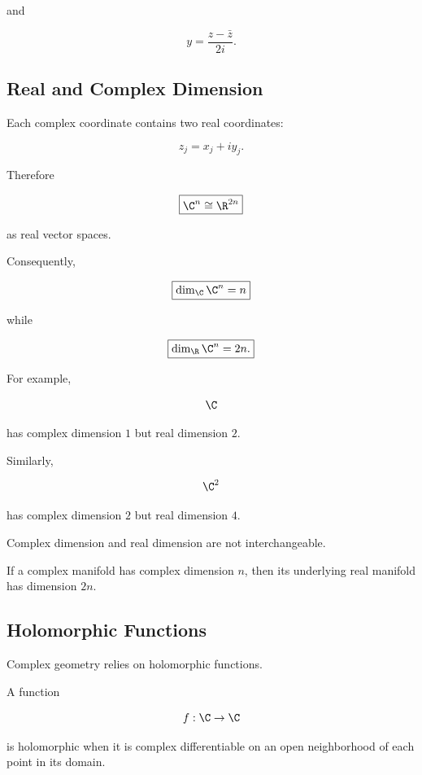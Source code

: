 and

\[
\boxed{y=\frac{z-\bar z}{2i}.}
\]

\subsection{Real and Complex Dimension}
\label{subsec:real-complex-dimension}

Each complex coordinate contains two real coordinates:

\[
z_j=x_j+iy_j.
\]

Therefore

\[
\boxed{\C^n\cong\R^{2n}}
\]

as real vector spaces.

Consequently,

\[
\boxed{
\dim_{\C}\C^n=n
}
\]

while

\[
\boxed{
\dim_{\R}\C^n=2n.
}
\]

For example,

\[
\C
\]

has complex dimension \(1\) but real dimension \(2\).

Similarly,

\[
\C^2
\]

has complex dimension \(2\) but real dimension \(4\).

\begin{warningbox}
Complex dimension and real dimension are not interchangeable.

If a complex manifold has complex dimension \(n\), then its underlying real
manifold has dimension \(2n\).
\end{warningbox}

\subsection{Holomorphic Functions}
\label{subsec:complex-geometry-holomorphic-functions}

Complex geometry relies on holomorphic functions.

A function

\[
f:\C\to\C
\]

is holomorphic when it is complex differentiable on an open neighborhood of
each point in its domain.

